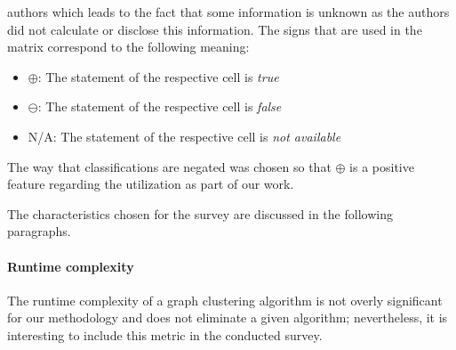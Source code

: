 \documentclass[12pt,a4paper]{report}
\begin{document}
\begin{table}[ht!]
{  authors which leads to the fact that some information is unknown as
  the authors did not calculate or disclose this information.
  The signs that are used in the matrix correspond to the following meaning:
  \begin{itemize}[noitemsep]
    \item $\oplus$: The statement of the respective cell is \textit{true}
    \item $\ominus$: The statement of the respective cell is \textit{false}
    \item N/A: The statement of the respective cell is \textit{not available}
  \end{itemize}
  The way that classifications are negated was chosen so that $\oplus$
  is a positive feature regarding the utilization as part of our work.
}
\label{table:graph-clustering-survey}
\end{table}

The characteristics chosen for the survey are discussed in the following
paragraphs.

\paragraph{Runtime complexity}
The runtime complexity of a graph clustering
algorithm is not overly significant for our methodology and does not eliminate
a given algorithm; nevertheless, it is interesting to include this metric in
the conducted survey.
\end{document}
